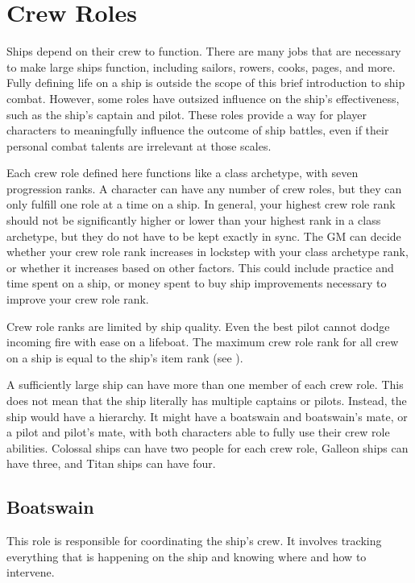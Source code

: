 \section{Crew Roles}\label{Crew Roles}
  Ships depend on their crew to function.
  There are many jobs that are necessary to make large ships function, including sailors, rowers, cooks, pages, and more.
  Fully defining life on a ship is outside the scope of this brief introduction to ship combat.
  However, some roles have outsized influence on the ship's effectiveness, such as the ship's captain and pilot.
  These roles provide a way for player characters to meaningfully influence the outcome of ship battles, even if their personal combat talents are irrelevant at those scales.

  Each crew role defined here functions like a class archetype, with seven progression ranks.
  A character can have any number of crew roles, but they can only fulfill one role at a time on a ship.
  In general, your highest crew role rank should not be significantly higher or lower than your highest rank in a class archetype, but they do not have to be kept exactly in sync.
  The GM can decide whether your crew role rank increases in lockstep with your class archetype rank, or whether it increases based on other factors.
  This could include practice and time spent on a ship, or money spent to buy ship improvements necessary to improve your crew role rank.

  Crew role ranks are limited by ship quality.
  Even the best pilot cannot dodge incoming fire with ease on a lifeboat.
  The maximum crew role rank for all crew on a ship is equal to the ship's item rank (see ).

  A sufficiently large ship can have more than one member of each crew role.
  This does not mean that the ship literally has multiple captains or pilots.
  Instead, the ship would have a hierarchy.
  It might have a boatswain and boatswain's mate, or a pilot and pilot's mate, with both characters able to fully use their crew role abilities.
  Colossal ships can have two people for each crew role, Galleon ships can have three, and Titan ships can have four.


  \subsection{Boatswain}
    This role is responsible for coordinating the ship's crew.
    It involves tracking everything that is happening on the ship and knowing where and how to intervene.

